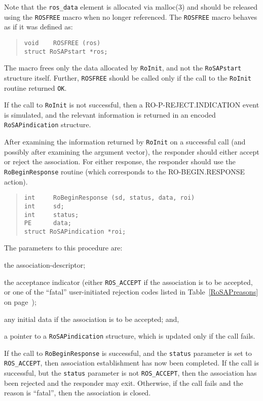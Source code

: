 Note that the \verb"ros_data" element is allocated via \man malloc(3) and
should be released using the \verb"ROSFREE" macro  when no longer referenced.
The \verb"ROSFREE" macro behaves as if it was defined as:
\begin{quote}\small\begin{verbatim}
void    ROSFREE (ros)
struct RoSAPstart *ros;
\end{verbatim}\end{quote}
The macro frees only the data allocated by \verb"RoInit",
and not the \verb"RoSAPstart" structure itself.
Further,
\verb"ROSFREE" should be called only if the call to the \verb"RoInit"
routine returned \verb"OK".

If the call to \verb"RoInit" is not successful,
then a {\sf RO-P-REJECT.IN\-DI\-CA\-TION\/} event is simulated,
and the relevant information is returned in an encoded
\verb"RoSAPindication" structure.

After examining the information returned by \verb"RoInit" on a successful call
(and possibly after examining the argument vector),
the responder should either accept or reject the association.
For either response,
the responder should use
the \verb"RoBeginResponse" routine
(which corresponds to the {\sf RO-BEGIN.RESPONSE\/} action).
\begin{quote}\small\begin{verbatim}
int     RoBeginResponse (sd, status, data, roi)
int     sd;
int     status;
PE      data;
struct RoSAPindication *roi;
\end{verbatim}\end{quote}
The parameters to this procedure are:
\begin{describe}
\item[\verb"sd":] the association-descriptor;

\item[\verb"status":] the acceptance indicator
(either \verb"ROS_ACCEPT" if the association is to be accepted,
or one of the ``fatal'' user-initiated rejection codes listed in
Table~\ref{RoSAPreasons} on page~\pageref{RoSAPreasons});

\item[\verb"data":] any initial data if the association is to be accepted;
and,

\item[\verb"roi":] a pointer to a \verb"RoSAPindication" structure, which is
updated only if the call fails.
\end{describe}
If the call to \verb"RoBeginResponse" is successful,
and the \verb"status" parameter is set to \verb"ROS_ACCEPT",
then association establishment has now been completed.
If the call is successful,
but the \verb"status" parameter is not \verb"ROS_ACCEPT",
then the association has been rejected and the responder may exit.
Otherwise,
if the call fails and the reason is ``fatal'',
then the association is closed.


